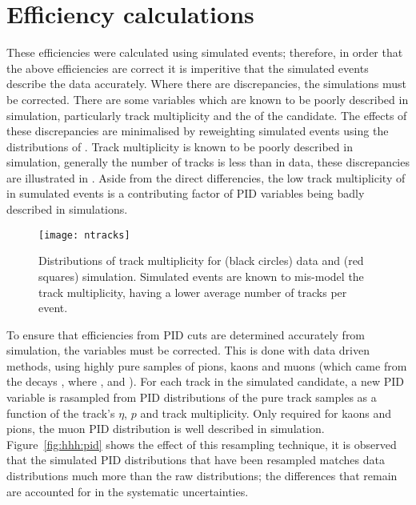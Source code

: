 \section{Efficiency calculations}
\label{sec:hhh:eff}


These efficiencies were calculated using simulated events; therefore, in order that the above
efficiencies are correct it is imperitive that the simulated events describe the data accurately.
Where there are discrepancies, the simulations must be corrected.
There are some variables which are known to be poorly described in simulation, particularly track
multiplicity and the \chisqvtx of the \Bp candidate.
The effects of these discrepancies are minimalised by reweighting simulated events using
the distributions of \btojpsikpipi.
Track multiplicity is known to be poorly described in simulation, generally the number of tracks is
less than in data, these discrepancies are illustrated in .
Aside from the direct differencies, the low track multiplicity of in sumulated events is a
contributing factor of PID variables being badly described in simulations.

\begin{figure}
  \begin{center}
    \texttt{[image: ntracks]}
    \caption[Differences between track multiplicity in data and simulation]
    {\small
      Distributions of track multiplicity for (black circles) data and (red squares) simulation.
      Simulated events are known to mis-model the track multiplicity, having a lower average number
      of tracks per event.
    }
    \label{fig:hhh:ntracks}
  \end{center}
\end{figure}

To ensure that efficiencies from PID cuts are determined accurately from simulation, the variables
must be corrected.
This is done with data driven methods, using highly pure samples of pions, kaons
and muons (which came from the decays \decay{\Dstarp}{\Dz\pip}, where \decay{\Dz}{\Km\pip}, and
\jpsitomumu).
For each track in the simulated \Bp candidate, a new PID variable is rasampled from PID
distributions of the pure track samples as a function of the track's $\eta$, $p$ and track
multiplicity.
Only required for kaons and pions, the muon PID distribution is well described in simulation.
Figure~\ref{fig:hhh:pid} shows the effect of this resampling technique, it is observed that the
simulated PID distributions that have been resampled matches data distributions much more than the
raw distributions; the differences that remain are accounted for in the systematic uncertainties.

